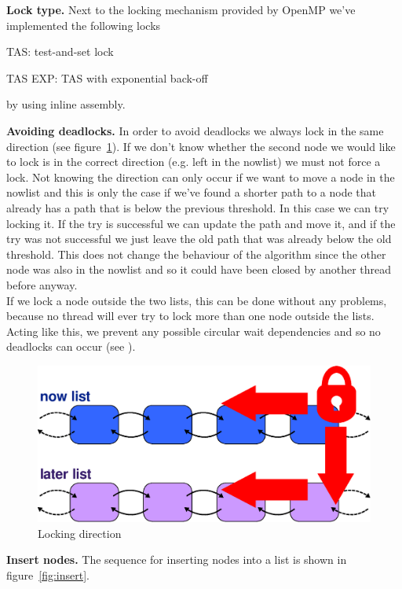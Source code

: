 \documentclass[letterpaper]{article}
\newcommand{\mypar}[1]{{\bf #1.}}
\begin{document}
\mypar{Lock type}
Next to the locking mechanism provided by OpenMP we've implemented the following locks
\begin{compactitem}
\item TAS: test-and-set lock
\item TAS EXP: TAS with exponential back-off
\end{compactitem}
by using inline assembly.

\mypar{Avoiding deadlocks}
In order to avoid deadlocks we always lock in the same direction (see figure~\ref{fig:lock}). If we don't know whether the second node we would like to lock is in the correct direction (e.g. left in the nowlist) we must not force a lock. Not knowing  the direction can only occur if we want to move a node in the nowlist and this is only the case if we've found a shorter path to a node that already has a path that is below the previous threshold. In this case we can try locking it. If the try is successful we can update the path and move it, and if the try was not successful we just leave the old path that was already below the old threshold. This does not change the behaviour of the algorithm since the other node was also in the nowlist and so it could have been closed by another thread before anyway. \\
If we lock a node outside the two lists, this can be done without any problems, because no thread will ever try to lock more than one node outside the lists.
Acting like this, we prevent any possible circular wait dependencies and so no deadlocks can occur (see \cite{Coffman:71}).

\begin{figure}[h]\centering
  \includegraphics[scale=0.38]{locking.eps}
  \caption{Locking direction \label{fig:lock}}
\end{figure}

\mypar{Insert nodes}
The sequence for inserting nodes into a list is shown in figure~\ref{fig:insert}.
\end{document}
